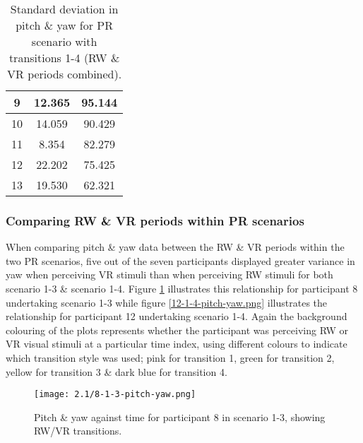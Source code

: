 \begin{table}
\begin{center}
\begin{minipage}[t]{.47\linewidth}
\begin{center}
\begin{tabular}{|c|c|c|}
\hline

9 & 12.365 & 95.144 \\

\hline

10 & 14.059 & 90.429 \\

\hline

11 & 8.354 & 82.279 \\

\hline

12 & 22.202 & 75.425 \\

\hline

13 & 19.530 & 62.321 \\

\hline
\end{tabular}
\caption{Standard deviation in pitch \& yaw for PR scenario with transitions 1-4 (RW \& VR periods combined).}
\label{2-1-sd-1-4}
\end{center}
\end{minipage}
\end{center}
\end{table}


\subsubsection{Comparing RW \& VR periods within PR scenarios}

When comparing pitch \& yaw data between the RW \& VR periods within the two PR scenarios, five out of the seven participants displayed greater variance in yaw when perceiving VR stimuli than when perceiving RW stimuli for both scenario 1-3 \& scenario 1-4. Figure \ref{8-1-3-pitch-yaw.png} illustrates this relationship for participant 8 undertaking scenario 1-3 while figure \ref{12-1-4-pitch-yaw.png} illustrates the relationship for participant 12 undertaking scenario 1-4. Again the background colouring of the plots represents whether the participant was perceiving RW or VR visual stimuli at a particular time index, using different colours to indicate which transition style was used; pink for transition 1, green for transition 2, yellow for transition 3 \& dark blue for transition 4.

\begin{figure}[h]
	\begin{center}
	\texttt{[image: 2.1/8-1-3-pitch-yaw.png]}
	\caption{Pitch \& yaw against time for participant 8 in scenario 1-3, showing RW/VR transitions.}
	\label{8-1-3-pitch-yaw.png}
	\end{center}
\end{figure}

